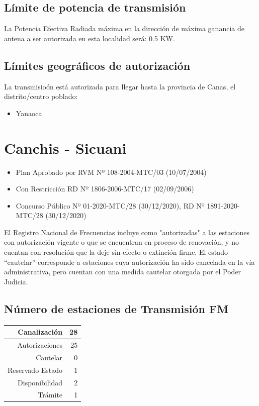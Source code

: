 \documentclass[11pt]{article}
\begin{document}
\subsection{Límite de potencia de transmisión}

La Potencia Efectiva Radiada máxima en la dirección de máxima ganancia de antena a ser autorizada en esta localidad será: 0.5 KW.

\subsection{Límites geográficos de autorización}

La transmisioón está autorizada para llegar hasta la provincia de Canas, el distrito/centro poblado:

\begin{itemize}
	\item Yanaoca
\end{itemize}



\section{Canchis - Sicuani}

\begin{itemize}
	\item Plan Aprobado por RVM Nº 108-2004-MTC/03 (10/07/2004)
	\item Con Restricción RD Nº 1806-2006-MTC/17 (02/09/2006)
	\item Concurso Público Nº 01-2020-MTC/28 (30/12/2020), RD Nº 1891-2020-MTC/28 (30/12/2020)
\end{itemize}

El Registro Nacional de Frecuencias incluye como "autorizadas" a las estaciones con autorización vigente o que se encuentran en proceso de renovación, y no cuentan con resolución que la deje sin efecto o extinción firme. El estado “cautelar” corresponde a estaciones cuya autorización ha sido cancelada en la vía administrativa, pero cuentan con una medida cautelar otorgada por el Poder Judicia.

\subsection{Número de estaciones de Transmisión FM}

\begin{tabular}{|r|r|} \hline
	Canalización 			& 28 \\ \hline
	Autorizaciones			& 25 \\ \hline
	Cautelar				& 0 \\ \hline
	Reservado Estado		& 1 \\ \hline
	Disponibilidad			& 2 \\ \hline
	Trámite					& 1 \\ \hline 
\end{tabular}
\end{document}
